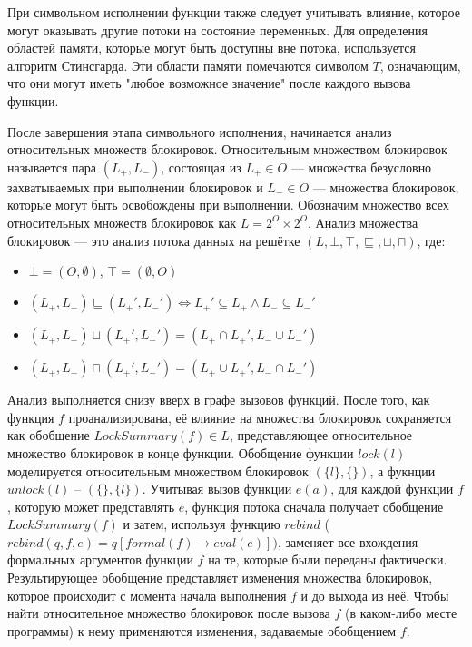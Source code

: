 При символьном исполнении функции также следует учитывать влияние, которое могут оказывать другие потоки на состояние переменных. Для определения областей памяти, которые могут быть доступны вне потока, используется алгоритм Стинсгарда. Эти области памяти помечаются символом $T$, означающим, что они могут иметь "любое возможное значение" после каждого вызова функции.

После завершения этапа символьного исполнения, начинается анализ относительных множеств блокировок. Относительным множеством блокировок называется пара $(L_{+}, L_{-})$, состоящая из $L_{+} \in O$ — множества безусловно захватываемых при выполнении блокировок и $L_{-} \in O$ — множества блокировок, которые могут быть освобождены при выполнении. Обозначим множество всех относительных множеств блокировок как $L = 2^{O} \times 2^{O}$. Анализ множества блокировок — это анализ потока данных на решётке $(L, \bot, \top, \sqsubseteq, \sqcup, \sqcap)$, где:
\begin{itemize}
\item $\bot = (O, \emptyset)$, $\top = (\emptyset, O)$
\item $(L_{+}, L_{-}) \sqsubseteq (L_{+}', L_{-}') \Longleftrightarrow L_{+}' \subseteq L_{+} \wedge L_{-} \subseteq L_{-}'$
\item $(L_{+}, L_{-}) \sqcup (L_{+}', L_{-}') = (L_{+} \cap L_{+}', L_{-} \cup L_{-}')$
\item $(L_{+}, L_{-}) \sqcap (L_{+}', L_{-}') = (L_{+} \cup L_{+}', L_{-} \cap L_{-}')$
\end{itemize}

Анализ выполняется снизу вверх в графе вызовов функций. После того, как функция $f$  проанализирована, её влияние на множества блокировок сохраняется как обобщение $LockSummary(f) \in L$, представляющее относительное множество блокировок в конце функции. Обобщение функции $lock(l)$  моделируется относительным множеством блокировок $(\{l\}, \{\})$, а фукнции $unlock(l)$ – $(\{\},\{l\})$. Учитывая вызов функции $e(a)$, для каждой функции $f$, которую может представлять $e$, функция потока сначала получает обобщение $LockSummary(f)$ и затем, используя функцию $rebind$ ($rebind(q, f, e) = q[formal(f ) → eval(e)])$, заменяет все вхождения формальных аргументов функции $f$ на те, которые были переданы фактически. Результирующее обобщение представляет изменения множества блокировок, которое происходит с момента начала выполнения $f$ и до выхода из неё. Чтобы найти относительное множество блокировок после вызова $f$ (в каком-либо месте программы) к нему применяются изменения, задаваемые обобщением $f$.

